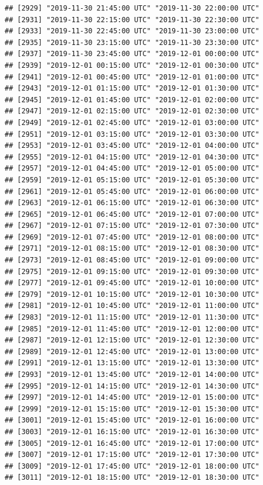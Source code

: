 \documentclass{article}\usepackage[]{graphicx}\usepackage[]{color}
\makeatletter
\newenvironment{kframe}{%
 \def\at@end@of@kframe{}%
 \ifinner\ifhmode%
  \def\at@end@of@kframe{\end{minipage}}%
  \begin{minipage}{\columnwidth}%
 \fi\fi%
 \def\FrameCommand##1{\hskip\@totalleftmargin \hskip-\fboxsep
 \colorbox{shadecolor}{##1}\hskip-\fboxsep
     \hskip-\linewidth \hskip-\@totalleftmargin \hskip\columnwidth}%
 \MakeFramed {\advance\hsize-\width
   \@totalleftmargin\z@ \linewidth\hsize
   \@setminipage}}%
 {\par\unskip\endMakeFramed%
 \at@end@of@kframe}
\newenvironment{knitrout}{}{} %
\makeatother
\begin{document}
\begin{knitrout}
\begin{kframe}
\begin{verbatim}
## [2929] "2019-11-30 21:45:00 UTC" "2019-11-30 22:00:00 UTC"
## [2931] "2019-11-30 22:15:00 UTC" "2019-11-30 22:30:00 UTC"
## [2933] "2019-11-30 22:45:00 UTC" "2019-11-30 23:00:00 UTC"
## [2935] "2019-11-30 23:15:00 UTC" "2019-11-30 23:30:00 UTC"
## [2937] "2019-11-30 23:45:00 UTC" "2019-12-01 00:00:00 UTC"
## [2939] "2019-12-01 00:15:00 UTC" "2019-12-01 00:30:00 UTC"
## [2941] "2019-12-01 00:45:00 UTC" "2019-12-01 01:00:00 UTC"
## [2943] "2019-12-01 01:15:00 UTC" "2019-12-01 01:30:00 UTC"
## [2945] "2019-12-01 01:45:00 UTC" "2019-12-01 02:00:00 UTC"
## [2947] "2019-12-01 02:15:00 UTC" "2019-12-01 02:30:00 UTC"
## [2949] "2019-12-01 02:45:00 UTC" "2019-12-01 03:00:00 UTC"
## [2951] "2019-12-01 03:15:00 UTC" "2019-12-01 03:30:00 UTC"
## [2953] "2019-12-01 03:45:00 UTC" "2019-12-01 04:00:00 UTC"
## [2955] "2019-12-01 04:15:00 UTC" "2019-12-01 04:30:00 UTC"
## [2957] "2019-12-01 04:45:00 UTC" "2019-12-01 05:00:00 UTC"
## [2959] "2019-12-01 05:15:00 UTC" "2019-12-01 05:30:00 UTC"
## [2961] "2019-12-01 05:45:00 UTC" "2019-12-01 06:00:00 UTC"
## [2963] "2019-12-01 06:15:00 UTC" "2019-12-01 06:30:00 UTC"
## [2965] "2019-12-01 06:45:00 UTC" "2019-12-01 07:00:00 UTC"
## [2967] "2019-12-01 07:15:00 UTC" "2019-12-01 07:30:00 UTC"
## [2969] "2019-12-01 07:45:00 UTC" "2019-12-01 08:00:00 UTC"
## [2971] "2019-12-01 08:15:00 UTC" "2019-12-01 08:30:00 UTC"
## [2973] "2019-12-01 08:45:00 UTC" "2019-12-01 09:00:00 UTC"
## [2975] "2019-12-01 09:15:00 UTC" "2019-12-01 09:30:00 UTC"
## [2977] "2019-12-01 09:45:00 UTC" "2019-12-01 10:00:00 UTC"
## [2979] "2019-12-01 10:15:00 UTC" "2019-12-01 10:30:00 UTC"
## [2981] "2019-12-01 10:45:00 UTC" "2019-12-01 11:00:00 UTC"
## [2983] "2019-12-01 11:15:00 UTC" "2019-12-01 11:30:00 UTC"
## [2985] "2019-12-01 11:45:00 UTC" "2019-12-01 12:00:00 UTC"
## [2987] "2019-12-01 12:15:00 UTC" "2019-12-01 12:30:00 UTC"
## [2989] "2019-12-01 12:45:00 UTC" "2019-12-01 13:00:00 UTC"
## [2991] "2019-12-01 13:15:00 UTC" "2019-12-01 13:30:00 UTC"
## [2993] "2019-12-01 13:45:00 UTC" "2019-12-01 14:00:00 UTC"
## [2995] "2019-12-01 14:15:00 UTC" "2019-12-01 14:30:00 UTC"
## [2997] "2019-12-01 14:45:00 UTC" "2019-12-01 15:00:00 UTC"
## [2999] "2019-12-01 15:15:00 UTC" "2019-12-01 15:30:00 UTC"
## [3001] "2019-12-01 15:45:00 UTC" "2019-12-01 16:00:00 UTC"
## [3003] "2019-12-01 16:15:00 UTC" "2019-12-01 16:30:00 UTC"
## [3005] "2019-12-01 16:45:00 UTC" "2019-12-01 17:00:00 UTC"
## [3007] "2019-12-01 17:15:00 UTC" "2019-12-01 17:30:00 UTC"
## [3009] "2019-12-01 17:45:00 UTC" "2019-12-01 18:00:00 UTC"
## [3011] "2019-12-01 18:15:00 UTC" "2019-12-01 18:30:00 UTC"

\end{verbatim}
\end{kframe}
\end{knitrout}
\end{document}
